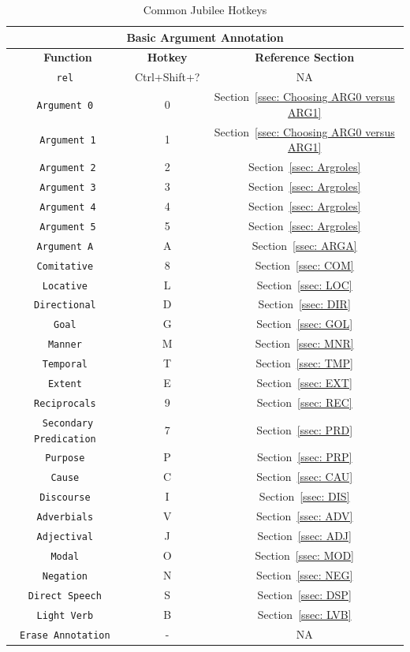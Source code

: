 \documentclass[11pt]{report}
\begin{document}
\begin{table}[htp]
\centering
\begin{tabular}{|c|c|c|}
\hline \multicolumn{3}{|c|}{\textbf{Basic Argument Annotation}} \\
\hline \textbf{Function} & \textbf{Hotkey} & \textbf{Reference Section} \\
\hline \tt rel & Ctrl+Shift+? & NA \\
\hline \tt Argument 0 & 0 & Section~\ref{ssec: Choosing ARG0 versus ARG1} \\
\hline \tt Argument 1& 1 & Section~\ref{ssec: Choosing ARG0 versus ARG1} \\
\hline \tt Argument 2& 2 & Section~\ref{ssec: Argroles} \\
\hline \tt Argument 3& 3 & Section~\ref{ssec: Argroles} \\
\hline \tt Argument 4& 4 & Section~\ref{ssec: Argroles} \\
\hline \tt Argument 5& 5 & Section~\ref{ssec: Argroles} \\
\hline \tt Argument A & A & Section~\ref{ssec: ARGA} \\
\hline \tt Comitative & 8 & Section~\ref{ssec: COM} \\
\hline \tt Locative & L & Section~\ref{ssec: LOC} \\
\hline \tt Directional & D & Section~\ref{ssec: DIR} \\
\hline \tt Goal & G & Section~\ref{ssec: GOL} \\
\hline \tt Manner & M & Section~\ref{ssec: MNR} \\
\hline \tt Temporal & T & Section~\ref{ssec: TMP} \\
\hline \tt Extent & E & Section~\ref{ssec: EXT} \\
\hline \tt Reciprocals & 9 & Section~\ref{ssec: REC} \\
\hline \tt Secondary Predication & 7 & Section~\ref{ssec: PRD} \\
\hline \tt Purpose & P & Section~\ref{ssec: PRP} \\
\hline \tt Cause & C & Section~\ref{ssec: CAU} \\
\hline \tt Discourse & I & Section~\ref{ssec: DIS} \\
\hline \tt Adverbials & V & Section~\ref{ssec: ADV} \\
\hline \tt Adjectival & J & Section~\ref{ssec: ADJ} \\
\hline \tt Modal & O & Section~\ref{ssec: MOD} \\
\hline \tt Negation & N & Section~\ref{ssec: NEG} \\
\hline \tt Direct Speech & S & Section~\ref{ssec: DSP} \\
\hline \tt Light Verb & B & Section~\ref{ssec: LVB} \\
\hline \tt Erase Annotation & - & NA \\
\hline 
\end{tabular}
\label{tbl: JubHotkeys1}
\caption{Common Jubilee Hotkeys}
\end{table} 
\end{document}
